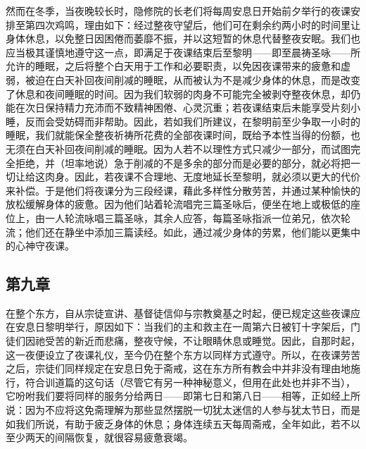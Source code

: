 然而在冬季，当夜晚较长时，隐修院的长老们将每周安息日开始前夕举行的夜课安排至第四次鸡鸣，理由如下：经过整夜守望后，他们可在剩余约两小时的时间里让身体休息，以免整日因困倦而萎靡不振，并以这短暂的休息代替整夜安眠。我们也应当极其谨慎地遵守这一点，即满足于夜课结束后至黎明——即至晨祷圣咏——所允许的睡眠，之后将整个白天用于工作和必要职责，以免因夜课带来的疲惫和虚弱，被迫在白天补回夜间削减的睡眠，从而被认为不是减少身体的休息，而是改变了休息和夜间睡眠的时间。因为我们软弱的肉身不可能完全被剥夺整夜休息，却仍能在次日保持精力充沛而不致精神困倦、心灵沉重；若夜课结束后未能享受片刻小睡，反而会受妨碍而非帮助。因此，若如我们所建议，在黎明前至少争取一小时的睡眠，我们就能保全整夜祈祷所花费的全部夜课时间，既给予本性当得的份额，也无须在白天补回夜间削减的睡眠。因为人若不以理性方式只减少一部分，而试图完全拒绝，并（坦率地说）急于削减的不是多余的部分而是必要的部分，就必将把一切让给这肉身。因此，若夜课不合理地、无度地延长至黎明，就必须以更大的代价来补偿。于是他们将夜课分为三段经课，藉此多样性分散劳苦，并通过某种愉快的放松缓解身体的疲惫。因为他们站着轮流唱完三篇圣咏后，便坐在地上或极低的座位上，由一人轮流咏唱三篇圣咏，其余人应答，每篇圣咏指派一位弟兄，依次轮流；他们还在静坐中添加三篇读经。如此，通过减少身体的劳累，他们能以更集中的心神守夜课。\par


\subsection{第九章}

\par

在整个东方，自从宗徒宣讲、基督徒信仰与宗教奠基之时起，便已规定这些夜课应在安息日黎明举行，原因如下：当我们的主和救主在一周第六日被钉十字架后，门徒们因祂受苦的新近而悲痛，整夜守候，不让眼睛休息或睡觉。因此，自那时起，这一夜便设立了夜课礼仪，至今仍在整个东方以同样方式遵守。所以，在夜课劳苦之后，宗徒们同样规定在安息日免于斋戒，这在东方所有教会中并非没有理由地施行，符合训道篇的这句话（尽管它有另一种神秘意义，但用在此处也并非不当），它吩咐我们要将同样的服务分给两日——即第七日和第八日——相等，正如经上所说：因为不应将这免斋理解为那些显然摆脱一切犹太迷信的人参与犹太节日，而是如我们所说，有助于疲乏身体的休息；身体连续五天每周斋戒，全年如此，若不以至少两天的间隔恢复，就很容易疲惫衰竭。\par

